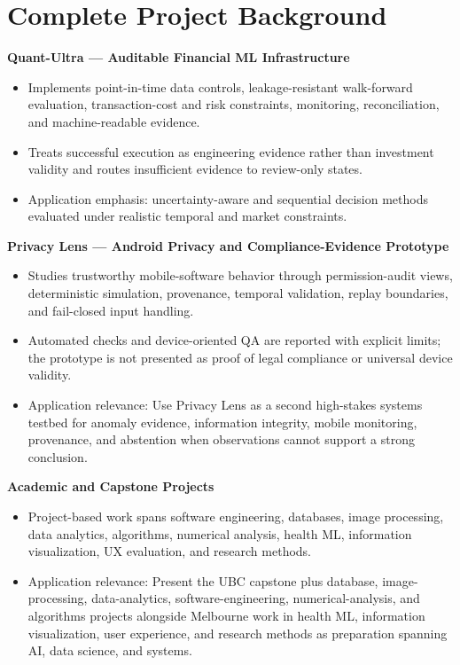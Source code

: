 \documentclass[11pt]{article}
\begin{document}
\section*{Complete Project Background}
\textbf{Quant-Ultra --- Auditable Financial ML Infrastructure}
\begin{itemize}
\item Implements point-in-time data controls, leakage-resistant walk-forward evaluation, transaction-cost and risk constraints, monitoring, reconciliation, and machine-readable evidence.
\item Treats successful execution as engineering evidence rather than investment validity and routes insufficient evidence to review-only states.
\item Application emphasis: uncertainty-aware and sequential decision methods evaluated under realistic temporal and market constraints.
\end{itemize}

\textbf{Privacy Lens --- Android Privacy and Compliance-Evidence Prototype}
\begin{itemize}
\item Studies trustworthy mobile-software behavior through permission-audit views, deterministic simulation, provenance, temporal validation, replay boundaries, and fail-closed input handling.
\item Automated checks and device-oriented QA are reported with explicit limits; the prototype is not presented as proof of legal compliance or universal device validity.
\item Application relevance: Use Privacy Lens as a second high-stakes systems testbed for anomaly evidence, information integrity, mobile monitoring, provenance, and abstention when observations cannot support a strong conclusion.
\end{itemize}

\textbf{Academic and Capstone Projects}
\begin{itemize}
\item Project-based work spans software engineering, databases, image processing, data analytics, algorithms, numerical analysis, health ML, information visualization, UX evaluation, and research methods.
\item Application relevance: Present the UBC capstone plus database, image-processing, data-analytics, software-engineering, numerical-analysis, and algorithms projects alongside Melbourne work in health ML, information visualization, user experience, and research methods as preparation spanning AI, data science, and systems.
\end{itemize}
\end{document}

